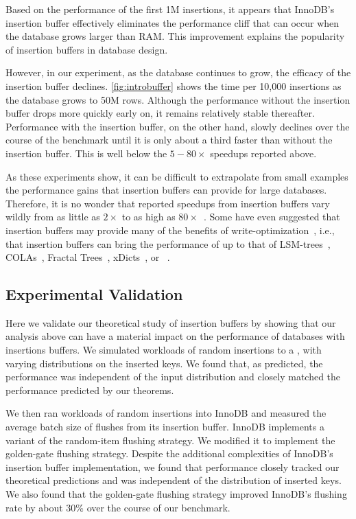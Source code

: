 Based on the performance of the first 1M insertions, it appears that InnoDB's
insertion buffer effectively eliminates the performance cliff that can occur
when the database grows larger than RAM.  This improvement explains the
popularity of insertion buffers in database design.

However, in our experiment, as the database continues to grow, the efficacy of
the insertion buffer declines.  \cref{fig:introbuffer} shows the time per
10,000 insertions as the database grows to 50M rows.  Although the performance
without the insertion buffer drops more quickly early on, it remains relatively
stable thereafter.  Performance with the insertion buffer, on the other hand,
slowly declines over the course of the benchmark until it is only about a third
faster than without the insertion buffer.  This is well below the $5-80\times$
speedups reported above.



As these experiments show, it can be difficult to extrapolate from small
examples the performance gains that insertion buffers can provide for large
databases. Therefore, it is no wonder that reported speedups from insertion
buffers vary wildly from as little as $2\times$ to as high as
$80\times$~\cite{Callaghan11}.  Some have even suggested that insertion buffers
may provide many of the benefits of write-optimization~\cite{Callaghan10},
i.e., that insertion buffers can bring the performance of \btrees{} up to that
of LSM-trees~\cite{ONeilChGa96}, COLAs~\cite{BenderFaFi07}, Fractal
Trees~\cite{Tokutek14}, xDicts~\cite{BrodalDeFi10}, or
\betrees{}~\cite{BrodalFa03}.

\subsection{Experimental Validation}
Here we validate our theoretical study of insertion buffers by showing that our
analysis above can have a material impact on the performance of databases with
insertions buffers.  We simulated workloads of random insertions to a \btree{},
with varying distributions on the inserted keys.  We found that, as predicted,
the performance was independent of the input distribution and closely matched
the performance predicted by our theorems.

We then ran workloads of random insertions into InnoDB and measured the average
batch size of flushes from its insertion buffer.  InnoDB implements a variant
of the random-item flushing strategy.  We modified it to implement the
golden-gate flushing strategy.  Despite the additional complexities of InnoDB's
insertion buffer implementation, we found that performance closely tracked our
theoretical predictions and was independent of the distribution of inserted
keys.  We also found that the golden-gate flushing strategy improved InnoDB's
flushing rate by about 30\% over the course of our benchmark.

